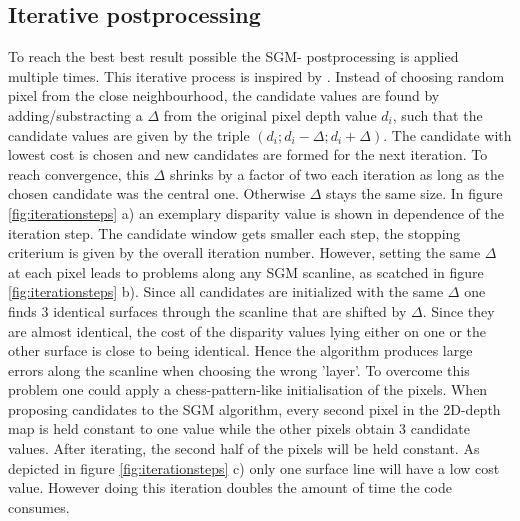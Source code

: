 \documentclass  [
  paper    = a4,
  BCOR     = 10mm,
  twoside,
  fontsize = 12pt,
  fleqn,
  toc      = bibnumbered,
  toc      = listofnumbered,
  numbers  = noendperiod,
  headings = normal,
  listof   = leveldown,
  version  = 3.03
]                                       {scrreprt}
\begin{document}
\subsection{Iterative postprocessing}
\label{sec:iterative}
To reach the best best result possible the SGM- postprocessing is applied multiple times. This iterative process is inspired by \cite{Benjaminsarbeit}. Instead of choosing random pixel from the close neighbourhood, the candidate values are found by adding/substracting a $\Delta$ from the original pixel depth value $d_{i}$, such that the candidate values are given by the triple $(d_{i};d_{i}-\Delta;d_{i}+\Delta)$. The candidate with lowest cost is chosen and new candidates are formed for the next iteration. To reach convergence, this $\Delta$ shrinks by a factor of two each iteration as long as the chosen candidate was the central one. Otherwise $\Delta$ stays the same size. In figure \ref{fig:iterationsteps} a) an exemplary disparity value is shown in dependence of the iteration step. The candidate window gets smaller each step, the stopping criterium is given by the overall iteration number. 
However, setting the same $\Delta$ at each pixel leads to problems along any SGM scanline, as scatched in figure \ref{fig:iterationsteps} b). Since all candidates are initialized with the same $\Delta$ one finds 3 identical surfaces through the scanline that are shifted by $\Delta$. Since they are almost identical, the cost of the disparity values lying either on one or the other surface is close to being identical. Hence the algorithm produces large errors along the scanline when choosing the wrong 'layer'. To overcome this problem one could apply a chess-pattern-like initialisation of the pixels. When proposing candidates to the SGM algorithm, every second pixel in the 2D-depth map is held constant to one value while the other pixels obtain 3 candidate values. After iterating, the second half of the pixels will be held constant. As depicted in figure \ref{fig:iterationsteps} c) only one surface line will have a low cost value. However doing this iteration doubles the amount of time the code consumes. 
\end{document}
